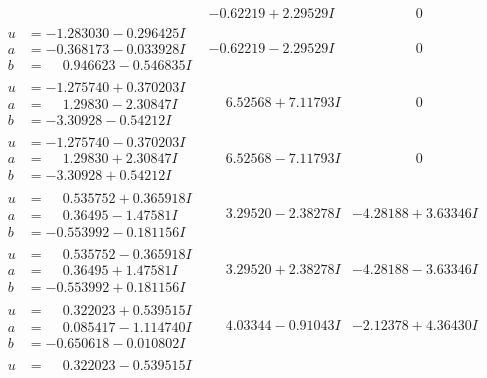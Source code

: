 \documentclass[1p]{elsarticle_modified}
\theoremstyle{definition}
\begin{document}
$$\begin{array}{c|c|c}
 & -0.62219 + 2.29529 I & \phantom{-0.000000 } 0 \\ \hline\begin{aligned}
u &= -1.283030 - 0.296425 I \\
a &= -0.368173 - 0.033928 I \\
b &= \phantom{-}0.946623 - 0.546835 I\end{aligned}
 & -0.62219 - 2.29529 I & \phantom{-0.000000 } 0 \\ \hline\begin{aligned}
u &= -1.275740 + 0.370203 I \\
a &= \phantom{-}1.29830 - 2.30847 I \\
b &= -3.30928 - 0.54212 I\end{aligned}
 & \phantom{-}6.52568 + 7.11793 I & \phantom{-0.000000 } 0 \\ \hline\begin{aligned}
u &= -1.275740 - 0.370203 I \\
a &= \phantom{-}1.29830 + 2.30847 I \\
b &= -3.30928 + 0.54212 I\end{aligned}
 & \phantom{-}6.52568 - 7.11793 I & \phantom{-0.000000 } 0 \\ \hline\begin{aligned}
u &= \phantom{-}0.535752 + 0.365918 I \\
a &= \phantom{-}0.36495 - 1.47581 I \\
b &= -0.553992 - 0.181156 I\end{aligned}
 & \phantom{-}3.29520 - 2.38278 I & -4.28188 + 3.63346 I \\ \hline\begin{aligned}
u &= \phantom{-}0.535752 - 0.365918 I \\
a &= \phantom{-}0.36495 + 1.47581 I \\
b &= -0.553992 + 0.181156 I\end{aligned}
 & \phantom{-}3.29520 + 2.38278 I & -4.28188 - 3.63346 I \\ \hline\begin{aligned}
u &= \phantom{-}0.322023 + 0.539515 I \\
a &= \phantom{-}0.085417 - 1.114740 I \\
b &= -0.650618 - 0.010802 I\end{aligned}
 & \phantom{-}4.03344 - 0.91043 I & -2.12378 + 4.36430 I \\ \hline\begin{aligned}
u &= \phantom{-}0.322023 - 0.539515 I \\

\end{aligned}
\end{array}$$
\end{document}
